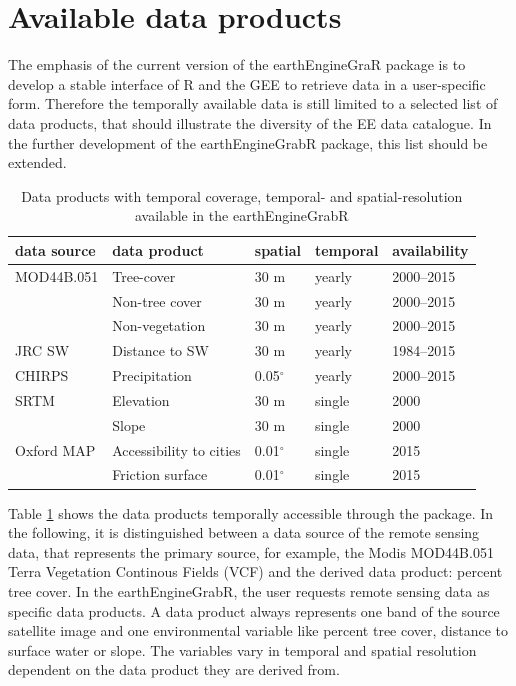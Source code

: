 \section{Available data products}

The emphasis of the current version of the earthEngineGraR package is to develop a stable interface of R and the GEE to retrieve data in a user-specific form. Therefore the temporally available data is still limited to a selected list of data products, that should illustrate the diversity of the EE data catalogue. In the further development of the earthEngineGrabR package, this list should be extended.

\begin{table}[h]
	\begin{tabularx}{\textwidth}{|l|l|X|X|X|}
		\hline
		\textbf{data source} & \textbf{data product} & \textbf{spatial} & \textbf{temporal} & \textbf{availability}\\
		\hline
		
		MOD44B.051 & Tree-cover  & 30 m & yearly & 2000–2015 \\
		
		& Non-tree cover  & 30 m & yearly & 2000–2015 \\
		
		& Non-vegetation  & 30 m & yearly & 2000–2015 \\
		
		JRC SW  & Distance to SW & 30 m & yearly & 1984–2015 \\
		
		CHIRPS & Precipitation & 0.05$^\circ$ & yearly & 2000–2015\\
		
		SRTM & Elevation  & 30 m & single & 2000\\
		& Slope  & 30 m & single & 2000\\
		
		Oxford MAP & Accessibility to cities  & 0.01$^\circ$ & single & 2015\\
		
		& Friction surface  & 0.01$^\circ$  & single & 2015\\
		
		\hline
	\end{tabularx}
	\caption{Data products with temporal coverage, temporal- and spatial-resolution available in the earthEngineGrabR}
	\label{data}
\end{table}

Table \ref{data} shows the data products temporally accessible through the package. In the following, it is distinguished between a data source of the remote sensing data, that represents the primary source, for example, the Modis MOD44B.051 Terra Vegetation Continous Fields (VCF) and the derived data product: percent tree cover. In the earthEngineGrabR, the user requests remote sensing data as specific data products. A data product always represents one band of the source satellite image and one environmental variable like percent tree cover, distance to surface water or slope.
The variables vary in temporal and spatial resolution dependent on the data product they are derived from. 

